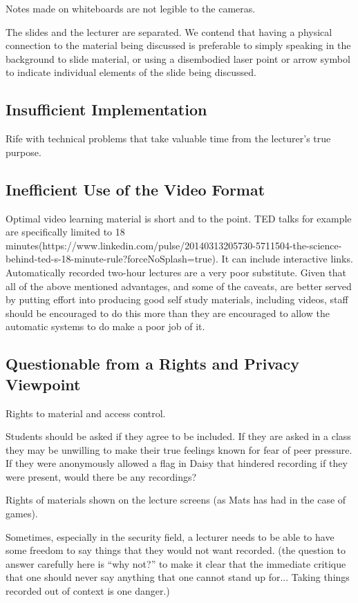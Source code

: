 \documentclass[a4paper,10pt]{article}
\begin{document}
Notes made on whiteboards are not legible to the cameras.

The slides and the lecturer are separated. We contend that having a physical connection to the material being discussed is preferable to simply speaking in the background to slide material, or using a disembodied laser point or arrow symbol to indicate individual elements of the slide being discussed. 

\subsection{Insufficient Implementation}
Rife with technical problems that take valuable time from the lecturer's true purpose. 

\subsection{Inefficient Use of the Video Format}
Optimal video learning material is short and to the point. TED talks for example are specifically limited to 18 minutes(https://www.linkedin.com/pulse/20140313205730-5711504-the-science-behind-ted-s-18-minute-rule?forceNoSplash=true). It can include interactive links. Automatically recorded two-hour lectures are a very poor substitute. Given that all of the above mentioned advantages, and some of the caveats, are better served by putting effort into producing good self study materials, including videos, staff should be encouraged to do this more than they are encouraged to allow the automatic systems to do make a poor job of it.

\subsection{Questionable from a Rights and Privacy Viewpoint}
Rights to material and access control.

Students should be asked if they agree to be included. If they are asked in a class they may be unwilling to make their true feelings known for fear of peer pressure. If they were anonymously allowed a flag in Daisy that hindered recording if they were present, would there be any recordings?

Rights of materials shown on the lecture screens (as Mats has had in the case of games).

Sometimes, especially in the security field, a lecturer needs to be able to have some freedom to say things that they would not want recorded. (the question to answer carefully here is 
``why not?''
 to make it clear that the immediate critique that one should never say anything that one cannot stand up for... Taking things recorded out of context is one danger.) 
\end{document}

